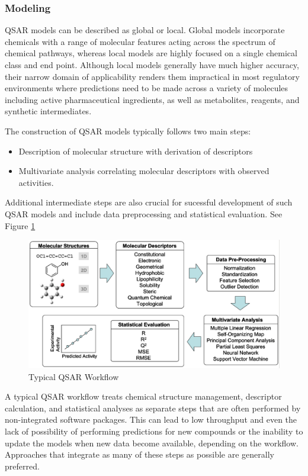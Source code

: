 \subsubsection{Modeling}
QSAR models can be described as global or local. Global models incorporate chemicals with a range of molecular features acting across the spectrum of chemical pathways, whereas local models are highly focused on a single chemical class and end point. Although local models generally have much higher accuracy, their narrow domain of applicability renders them impractical in most regulatory environments where predictions need to be made across a variety of molecules including active pharmaceutical ingredients, as well as metabolites, reagents, and synthetic intermediates. \cite{Kruhlak2012}

The construction of QSAR models typically follows two main steps:
\begin{itemize}
\item Description of molecular structure with derivation of descriptors
\item Multivariate analysis correlating molecular descriptors with observed activities. 
\end{itemize}
Additional intermediate steps are also crucial for sucessful development of such QSAR models and include data preprocessing and statistical evaluation. See Figure \ref{fig:QSARworkflow} \cite{Nantasenamat2009}

\begin{figure}[h,t]
  \centering
  \includegraphics[width=1\textwidth]{../img/SchematicQSAR.png}
  \caption[Typical QSAR Workflow]{Typical QSAR Workflow \cite{Nantasenamat2009}}
  \label{fig:QSARworkflow}
\end{figure}

A typical QSAR workflow treats chemical structure management, descriptor calculation, and statistical analyses as separate steps that are often performed by non-integrated software packages. This can lead to low throughput and even the lack of possibility of performing predictions for new compounds or the inability to update the models when new data become available, depending on the workflow. Approaches that integrate as many of these steps as possible are generally preferred.

